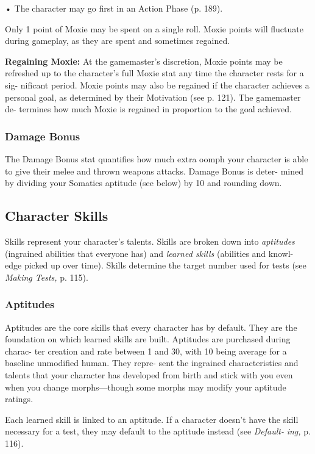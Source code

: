 •  The character may go first in an Action Phase (p. 189).

Only 1 point of Moxie may be spent on a single roll. 
Moxie points will fluctuate during gameplay, as they 
are spent and sometimes regained.

\textbf{Regaining Moxie:} At the gamemaster's discretion, 
Moxie points may be refreshed up to the character's 
full Moxie stat any time the character rests for a sig-
nificant period. Moxie points may also be regained if 
the character achieves a personal goal, as determined 
by their Motivation (see p. 121). The gamemaster de-
termines how much Moxie is regained in proportion 
to the goal achieved.

\subsubsection{Damage Bonus}


The Damage Bonus stat quantifies how much extra 
oomph your character is able to give their melee and 
thrown weapons attacks. Damage Bonus is deter-
mined by dividing your Somatics aptitude (see below) 
by 10 and rounding down.

\subsection{Character Skills}

Skills represent your character's talents. Skills are 
broken down into \textit{aptitudes} (ingrained abilities that 
everyone has) and \textit{learned skills} (abilities and knowl-
edge picked up over time). Skills determine the target 
number used for tests (see \textit{Making Tests,} p. 115).

\subsubsection{Aptitudes}

Aptitudes are the core skills that every character has 
by default. They are the foundation on which learned 
skills are built. Aptitudes are purchased during charac-
ter creation and rate between 1 and 30, with 10 being 
average for a baseline unmodified human. They repre-
sent the ingrained characteristics and talents that your 
character has developed from birth and stick with you 
even when you change morphs—though some morphs 
may modify your aptitude ratings.

Each learned skill is linked to an aptitude. If a 
character doesn't have the skill necessary for a test, 
they may default to the aptitude instead (see \textit{Default-}
\textit{ing,} p. 116).

